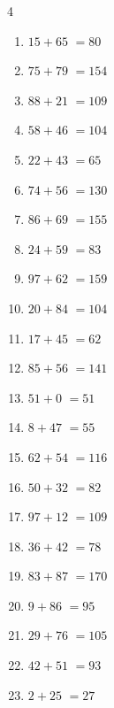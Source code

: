 \begin{multicols}{4}
\begin{enumerate}
  \item $15+65$
        $=80$

  \item $75+79$
        $=154$

\columnbreak %

  \item $88+21$
        $=109$

  \item $58+46$
        $=104$

  \item $22+43$
        $=65$

  \item $74+56$
        $=130$

  \item $86+69$
        $=155$

  \item $24+59$
        $=83$

  \item $97+62$
        $=159$

  \item $20+84$
        $=104$

  \item $17+45$
        $=62$

  \item $85+56$
        $=141$

  \item $51+0$
        $=51$

  \item $8+47$
        $=55$

  \item $62+54$
        $=116$

  \item $50+32$
        $=82$

  \item $97+12$
        $=109$

  \item $36+42$
        $=78$

  \item $83+87$
        $=170$

  \item $9+86$
        $=95$

  \item $29+76$
        $=105$

  \item $42+51$
        $=93$

  \item $2+25$
        $=27$


\end{enumerate}
\end{multicols}
